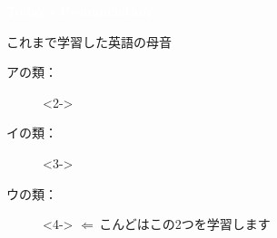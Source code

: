 \documentclass[aspectratio=169, xcolor={dvipsnames,table}]{beamer}
\begin{document}
\begin{frame}
  \centering
  \textcolor{white}{\Huge\bfseries Today's Pronunciation}

  \vspace{30pt}

\end{frame}
\begin{frame}[plain,label=sofar_i]{これまで学習した英語の母音}
  \begin{description}
    \item[アの類：]<2-> {\Large \textipa{/\ae /}  \textipa{/\textturnv /}  }

    \item[イの類：]<3-> {\Large {} }

    \item[ウの類：]<4-> {\Large {} } $\Longleftarrow$\,こんどはこの2つを学習します
  \end{description}
\end{frame}
\end{document}
